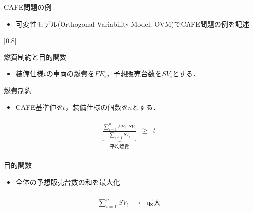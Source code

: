 \documentclass[dvipdfmx, 11pt]{beamer}
\begin{document}
\begin{frame}{CAFE問題の例}
 \begin{itemize}
  \item 可変性モデル(Orthogonal Variability Model; OVM)でCAFE問題の例を記述
 \end{itemize}
 \scalebox{0.8}[0.8]{%
  
 }
\end{frame}
\begin{frame}{燃費制約と目的関数}
 \begin{itemize}
  \item 装備仕様$i$の車両の燃費を$FE_i$，予想販売台数を$SV_i$とする．
 \end{itemize}
 \begin{block}{燃費制約}
  \begin{itemize}
   \item CAFE基準値を$t$，装備仕様の個数を$n$とする．
  \end{itemize} 
  \[
  \begin{array}{lcr}
   & & \\
   \underbrace{\displaystyle\frac{\sum_{i=1}^{n} FE_{i}\cdot SV_{i}}{\sum_{i=1}^{n} SV_{i}}}_{\mbox{平均燃費}}
    &
    \geq 
    &
    t \\
   & & 
  \end{array}
  \]
 \end{block}
 \begin{block}{目的関数}
  \begin{itemize}
   \item 全体の予想販売台数の和を最大化
  \end{itemize}
  \[
  \begin{array}{lcr}
   & & \\
   \sum_{i=1}^{n}{SV_{i}} & \longrightarrow & \mbox{最大} \\
   & & 
  \end{array}
  \]
 \end{block}
\end{frame}
\end{document}
